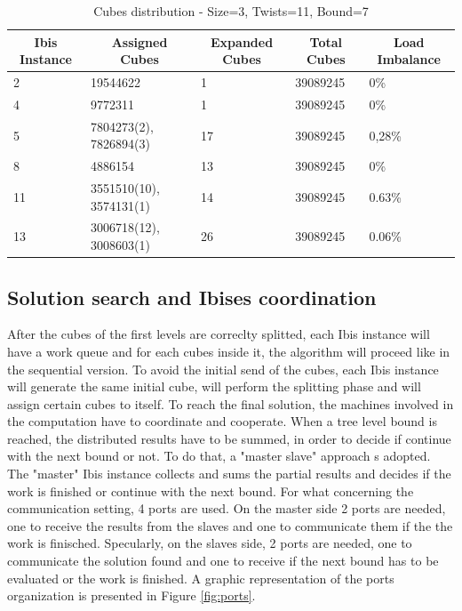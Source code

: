 \documentclass[a4paper]{article}
\begin{document}
\centering
\begin{table}[!ht]
\centering
\caption{Cubes distribution - Size=3, Twists=11, Bound=7}
\label{table:tlow}
\begin{tabular}{l|l|l|l|l}
\multicolumn{1}{c}{\bfseries Ibis Instance} & \multicolumn{1}{c}{\bfseries Assigned Cubes} & \multicolumn{1}{c}{\bfseries Expanded Cubes} & \multicolumn{1}{c}{\bfseries Total Cubes} & \multicolumn{1}{c}{\bfseries Load Imbalance} \\ \hline
2 & 19544622 & 1 & 39089245 & 0\%  \\ \hline
4 & 9772311 & 1 & 39089245 & 0\% \\ \hline
5 & 7804273(2), 7826894(3) & 17 & 39089245 & 0,28\% \\ \hline
8 & 4886154 & 13 & 39089245 & 0\% \\ \hline
11 & 3551510(10), 3574131(1) & 14 & 39089245 & 0.63\% \\ \hline
13 & 3006718(12), 3008603(1) & 26 & 39089245 & 0.06\%
\end{tabular}
\end{table}
\FloatBarrier

\subsection{Solution search and Ibises coordination}
\label{sec:ibis_setting}
After the cubes of the first levels are correclty splitted, each Ibis instance will have a work queue and for each cubes inside it, the algorithm will proceed like in the sequential version. To avoid the initial send of the cubes, each Ibis instance will generate the same initial cube, will perform the splitting phase and will assign certain cubes to itself. To reach the final solution, the machines involved in the computation have to coordinate and cooperate. When a tree level bound is reached, the distributed results have to be summed, in order to decide if continue with the next bound or not. To do that, a "master slave" approach s adopted. The "master" Ibis instance collects and sums the partial results and decides if the work is finished or continue with the next bound. For what concerning the communication setting, 4 ports are used. On the master side 2 ports are needed, one to receive the results from the slaves and one to communicate them if the  the work is finisched. Specularly, on the slaves side, 2 ports are needed, one to communicate the solution found and one to receive if the next bound has to be evaluated or the work is finished. A graphic representation of the ports organization is presented in Figure \ref{fig:ports}.
\end{document}
